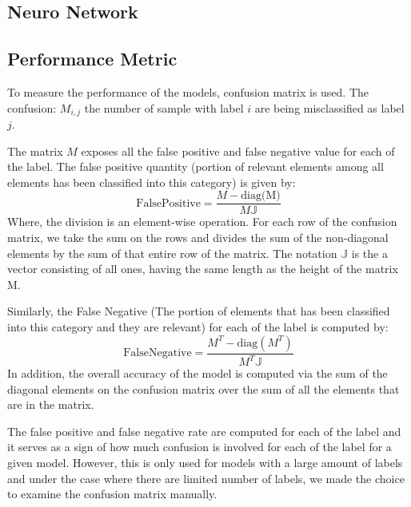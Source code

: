 \documentclass{article}
\begin{document}
    \subsection*{Neuro Network}

    \subsection*{Performance Metric}
        \hspace{1.1em}
        To measure the performance of the models, confusion matrix is used. The confusion: $M_{i, j}$ the number of sample with label $i$ are being misclassified as label $j$. 
        \par
        The matrix $M$ exposes all the false positive and false negative value for each of the label. The false positive quantity (portion of relevant elements among all elements has been classified into this category) is given by: 
        \begin{equation*}\tag{12}\label{eqn:12}
           \text{FalsePositive} = \frac{M - \text{diag(M)}}{M\mathbb{J}}
        \end{equation*} 
        Where, the division is an element-wise operation. For each row of the confusion matrix, we take the sum on the rows and divides the sum of the non-diagonal elements by the sum of that entire row of the matrix. The notation $\mathbb{J}$ is the a vector consisting of all ones, having the same length as the height of the matrix M. 
        \par
        Similarly, the False Negative (The portion of elements that has been classified into this category and they are relevant) for each of the label is computed by: 
        \begin{equation*}\tag{13}\label{eqn:13}
            \text{FalseNegative} = \frac{M^T - \text{diag}(M^T)}{M^T\mathbb{J}}
        \end{equation*}
        In addition, the overall accuracy of the model is computed via the sum of the diagonal elements on the confusion matrix over the sum of all the elements that are in the matrix.
        \par
        The false positive and false negative rate are computed for each of the label and it serves as a sign of how much confusion is involved for each of the label for a given model. However, this is only used for models with a large amount of labels and under the case where there are limited number of labels, we made the choice to examine the confusion matrix manually. 
\end{document}
